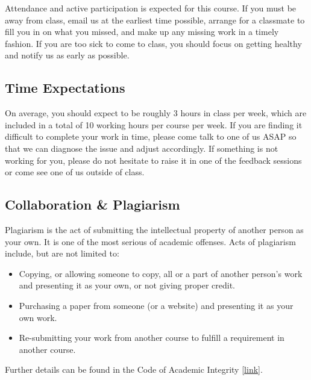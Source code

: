 \documentclass[
]{article}
\begin{document}
Attendance and active participation is expected for this course. If you must be away from class, email us at the earliest time possible, arrange for a classmate to fill you in on what you missed, and make up any missing work in a timely fashion. If you are too sick to come to class, you should focus on getting healthy and notify us as early as possible.

\hypertarget{time-expectations}{%
\subsection*{Time Expectations}\label{time-expectations}}

On average, you should expect to be roughly 3 hours in class per week, which are included in a total of 10 working hours per course per week. If you are finding it difficult to complete your work in time, please come talk to one of us ASAP so that we can diagnose the issue and adjust accordingly. If something is not working for you, please do not hesitate to raise it in one of the feedback sessions or come see one of us outside of class.

\hypertarget{collaboration-plagiarism}{%
\subsection*{Collaboration \& Plagiarism}\label{collaboration-plagiarism}}

Plagiarism is the act of submitting the intellectual property of another person as your own. It is one of the most serious of academic offenses. Acts of plagiarism include, but are not limited to:

\begin{itemize}
\item
  Copying, or allowing someone to copy, all or a part of another person's work and presenting it as your own, or not giving proper credit.
\item
  Purchasing a paper from someone (or a website) and presenting it as your own work.
\item
  Re-submitting your work from another course to fulfill a requirement in another course.
\end{itemize}

Further details can be found in the Code of Academic Integrity {[}\href{https://fulbright.edu.vn/articles/Code\%20of\%20Academic\%20Integrity/Code\%20of\%20Academic\%20Integrity_\%20Excom\%20Endorsed.pdf}{link}{]}.
\end{document}
